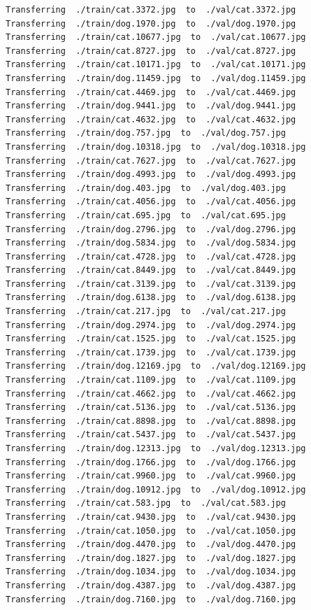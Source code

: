 \documentclass[]{book}
\theoremstyle{definition}
\theoremstyle{definition}
\theoremstyle{definition}
\theoremstyle{remark}
\begin{document}
\begin{verbatim}
Transferring  ./train/cat.3372.jpg  to  ./val/cat.3372.jpg
Transferring  ./train/dog.1970.jpg  to  ./val/dog.1970.jpg
Transferring  ./train/cat.10677.jpg  to  ./val/cat.10677.jpg
Transferring  ./train/cat.8727.jpg  to  ./val/cat.8727.jpg
Transferring  ./train/cat.10171.jpg  to  ./val/cat.10171.jpg
Transferring  ./train/dog.11459.jpg  to  ./val/dog.11459.jpg
Transferring  ./train/cat.4469.jpg  to  ./val/cat.4469.jpg
Transferring  ./train/dog.9441.jpg  to  ./val/dog.9441.jpg
Transferring  ./train/cat.4632.jpg  to  ./val/cat.4632.jpg
Transferring  ./train/dog.757.jpg  to  ./val/dog.757.jpg
Transferring  ./train/dog.10318.jpg  to  ./val/dog.10318.jpg
Transferring  ./train/cat.7627.jpg  to  ./val/cat.7627.jpg
Transferring  ./train/dog.4993.jpg  to  ./val/dog.4993.jpg
Transferring  ./train/dog.403.jpg  to  ./val/dog.403.jpg
Transferring  ./train/cat.4056.jpg  to  ./val/cat.4056.jpg
Transferring  ./train/cat.695.jpg  to  ./val/cat.695.jpg
Transferring  ./train/dog.2796.jpg  to  ./val/dog.2796.jpg
Transferring  ./train/dog.5834.jpg  to  ./val/dog.5834.jpg
Transferring  ./train/cat.4728.jpg  to  ./val/cat.4728.jpg
Transferring  ./train/cat.8449.jpg  to  ./val/cat.8449.jpg
Transferring  ./train/cat.3139.jpg  to  ./val/cat.3139.jpg
Transferring  ./train/dog.6138.jpg  to  ./val/dog.6138.jpg
Transferring  ./train/cat.217.jpg  to  ./val/cat.217.jpg
Transferring  ./train/dog.2974.jpg  to  ./val/dog.2974.jpg
Transferring  ./train/cat.1525.jpg  to  ./val/cat.1525.jpg
Transferring  ./train/cat.1739.jpg  to  ./val/cat.1739.jpg
Transferring  ./train/dog.12169.jpg  to  ./val/dog.12169.jpg
Transferring  ./train/cat.1109.jpg  to  ./val/cat.1109.jpg
Transferring  ./train/cat.4662.jpg  to  ./val/cat.4662.jpg
Transferring  ./train/cat.5136.jpg  to  ./val/cat.5136.jpg
Transferring  ./train/cat.8898.jpg  to  ./val/cat.8898.jpg
Transferring  ./train/cat.5437.jpg  to  ./val/cat.5437.jpg
Transferring  ./train/dog.12313.jpg  to  ./val/dog.12313.jpg
Transferring  ./train/dog.1766.jpg  to  ./val/dog.1766.jpg
Transferring  ./train/cat.9960.jpg  to  ./val/cat.9960.jpg
Transferring  ./train/dog.10912.jpg  to  ./val/dog.10912.jpg
Transferring  ./train/cat.583.jpg  to  ./val/cat.583.jpg
Transferring  ./train/cat.9430.jpg  to  ./val/cat.9430.jpg
Transferring  ./train/cat.1050.jpg  to  ./val/cat.1050.jpg
Transferring  ./train/dog.4470.jpg  to  ./val/dog.4470.jpg
Transferring  ./train/dog.1827.jpg  to  ./val/dog.1827.jpg
Transferring  ./train/dog.1034.jpg  to  ./val/dog.1034.jpg
Transferring  ./train/dog.4387.jpg  to  ./val/dog.4387.jpg
Transferring  ./train/dog.7160.jpg  to  ./val/dog.7160.jpg

\end{verbatim}
\end{document}
